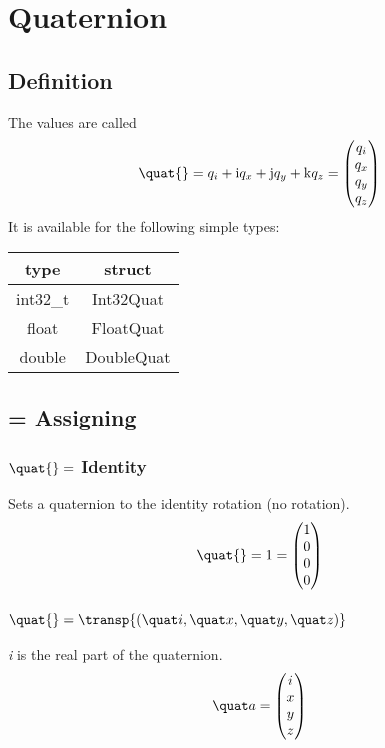 \section{Quaternion}
\subsection{Definition}
The values are called
\begin{equation}
\quat{} = q_i + \mathrm{i} q_x + \mathrm{j} q_y + \mathrm{k} q_z
 = \begin{pmatrix} q_i \\q_x\\q_y\\q_z\end{pmatrix}
\end{equation}
It is available for the following simple types:\\
\begin{tabular}{c|c}
type		& struct		\\ \hline
int32\_t	& Int32Quat		\\
float		& FloatQuat		\\
double		& DoubleQuat		
\end{tabular}




\subsection{= Assigning}
\subsubsection*{$\quat{} = $ Identity}
Sets a quaternion to the identity rotation (no rotation).
\begin{equation}
\quat{} = 1 = \begin{pmatrix}1 \\ 0 \\0\\0\end{pmatrix}
\end{equation}

\subsubsection*{$\quat{} = \transp{(\quat i,\quat x,\quat y,\quat z)}$}
\textit{i} is the real part of the quaternion.
\begin{equation}
 \quat a = \begin{pmatrix}i\\ x \\ y \\ z \end{pmatrix}
\end{equation}

